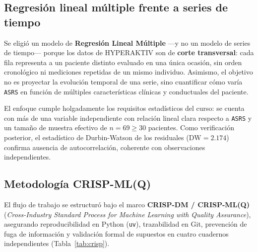 \documentclass[11pt,letterpaper]{article}
\begin{document}
\subsection{Regresión lineal múltiple frente a series de tiempo}

Se eligió un modelo de \textbf{Regresión Lineal Múltiple} ---y no un modelo de series de tiempo--- porque los datos de HYPERAKTIV son de \textbf{corte transversal}: cada fila representa a un paciente distinto evaluado en una única ocasión, sin orden cronológico ni mediciones repetidas de un mismo individuo. Asimismo, el objetivo no es proyectar la evolución temporal de una serie, sino cuantificar cómo varía \texttt{ASRS} en función de múltiples características clínicas y conductuales del paciente.

El enfoque cumple holgadamente los requisitos estadísticos del curso: se cuenta con más de una variable independiente con relación lineal clara respecto a \texttt{ASRS} y un tamaño de muestra efectivo de $n = 69 \ge 30$ pacientes. Como verificación posterior, el estadístico de Durbin-Watson de los residuales ($\text{DW} = 2.174$) confirma ausencia de autocorrelación, coherente con observaciones independientes.

\subsection{Metodología CRISP-ML(Q)}

El flujo de trabajo se estructuró bajo el marco \textbf{CRISP-DM / CRISP-ML(Q)} (\textit{Cross-Industry Standard Process for Machine Learning with Quality Assurance}), asegurando reproducibilidad en Python (\texttt{uv}), trazabilidad en Git, prevención de fuga de información y validación formal de supuestos en cuatro cuadernos independientes (Tabla~\ref{tab:crisp}).
\end{document}
